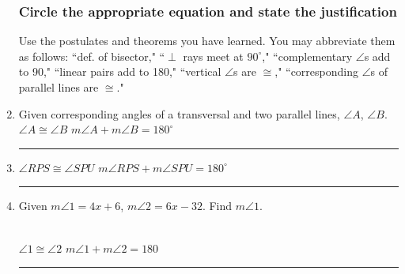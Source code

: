 \documentclass[12pt, oneside]{article}
\begin{document}
\begin{enumerate}
\newpage


\subsubsection*{Circle the appropriate equation and state the justification}
Use the postulates and theorems you have learned. You may abbreviate them as follows: ``def. of bisector," ``$\perp$ rays meet at $90^\circ$," ``complementary $\angle$s add to 90," ``linear pairs add to 180," ``vertical $\angle$s are $\cong$," ``corresponding $\angle$s of parallel lines are $\cong$."

\item Given corresponding angles of a transversal and two parallel lines, $\angle A$, $\angle B$.\\[0.5cm]
$\angle A \cong \angle B$ \hspace{1cm} $m \angle A + m \angle B=180^\circ$ \hspace{0.5cm} \rule{5cm}{0.15mm} \vspace{0.25cm}

\item $\angle RPS \cong \angle SPU$ \hspace{0.25cm} $m \angle RPS + m \angle SPU = 180^\circ$ \hspace{0.25cm} \rule{6cm}{0.15mm}  \vspace{0.25cm}

\item Given $m \angle 1 = 4x+6$, $m \angle 2 = 6x-32$. Find $m \angle 1$.
    \\[0.5cm]
    $\angle 1 \cong \angle 2$ \hspace{1cm} $m\angle 1 + m\angle 2 =  180$ \hspace{0.5cm} \rule{6cm}{0.15mm}


\end{enumerate}
\end{document}
